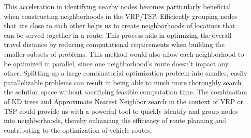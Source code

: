 \documentclass{article}
\begin{document}
This acceleration in identifying nearby nodes becomes particularly beneficial when constructing neighborhoods in the VRP/TSP. Efficiently grouping nodes that are close to each other helps us to create neighborhoods of locations that can be served together in a route. This process aids in optimizing the overall travel distance by reducing computational requirements when building the smaller subsets of problems. This method would also allow each neighborhood to be optimized in parallel, since one neighborhood's route doesn't impact any other. Splitting up a large combinatorial optimization problem into smaller, easily parallelizable problems can result in being able to much more thoroughly search the solution space without sacrificing feasible computation time. The combination of KD trees and Approximate Nearest Neighbor search in the context of VRP or TSP could provide us with a powerful tool to quickly identify and group nodes into neighborhoods, thereby enhancing the efficiency of route planning and contributing to the optimization of vehicle routes.


    \newpage
    \printbibliography
\end{document}
